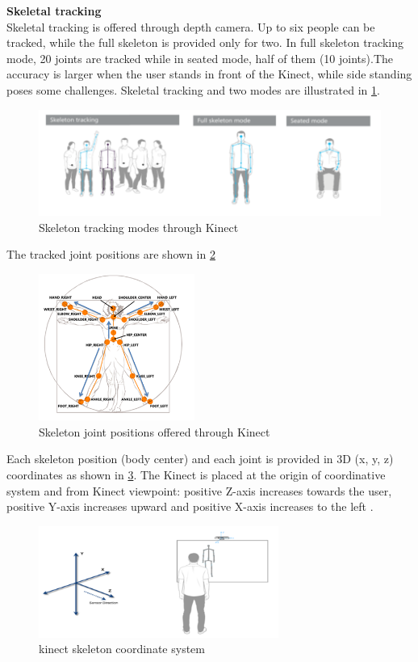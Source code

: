 \textbf{Skeletal tracking }\\
Skeletal tracking is offered through depth camera. Up to six people can be tracked, while the full skeleton is provided only for two. In full skeleton tracking mode, 20 joints are tracked while in seated mode, half of them (10 joints).The accuracy is larger when the user stands in front of the Kinect, while side standing poses some challenges. Skeletal tracking and two modes are  illustrated in \ref{fig:cam6}.

\begin{figure}[H]
\centering
\includegraphics[width=1.0\textwidth]{img/afterworking4.png}
\caption{Skeleton tracking modes through Kinect }
\label{fig:cam6}
\end{figure}

The tracked joint positions are shown in \ref{fig:cam77}
\begin{figure}[H]
\centering
\includegraphics[width=0.4555\textwidth]{img/afterworking5.png}
\caption{Skeleton joint positions offered  through Kinect }
\label{fig:cam77}
\end{figure}

Each skeleton position (body center) and each joint is provided in 3D (x, y, z) coordinates as 
shown in \ref{fig:cam7}. The Kinect is placed at the origin of coordinative system and from Kinect viewpoint: positive Z-axis increases towards the user, positive  Y-axis increases upward and positive  X-axis increases to the left .  

\begin{figure}[H]
\centering
\includegraphics[width=0.7\textwidth]{img/afterworking6.png}
\caption{kinect skeleton coordinate system  }
\label{fig:cam7}
\end{figure}


